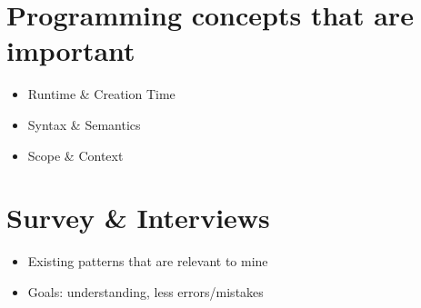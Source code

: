 \section{Programming concepts that are
important}\label{programming-concepts-that-are-important}

\begin{itemize}
\itemsep1pt\parskip0pt
\item
  Runtime \& Creation Time
\item
  Syntax \& Semantics
\item
  Scope \& Context
\end{itemize}

\section{Survey \& Interviews}\label{survey-interviews}

\begin{itemize}
\itemsep1pt\parskip0pt
\item
  Existing patterns that are relevant to mine
\item
  Goals: understanding, less errors/mistakes
\end{itemize}
